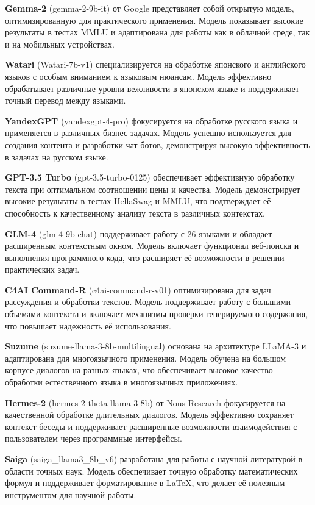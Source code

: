 \textbf{Gemma-2} (gemma-2-9b-it) от Google представляет собой открытую модель, оптимизированную для практического применения. Модель показывает высокие результаты в тестах MMLU и адаптирована для работы как в облачной среде, так и на мобильных устройствах. \cite{gemma}

\textbf{Watari} (Watari-7b-v1) специализируется на обработке японского и английского языков с особым вниманием к языковым нюансам. Модель эффективно обрабатывает различные уровни вежливости в японском языке и поддерживает точный перевод между языками. \cite{watari}

\textbf{YandexGPT} (yandexgpt-4-pro) фокусируется на обработке русского языка и применяется в различных бизнес-задачах. Модель успешно используется для создания контента и разработки чат-ботов, демонстрируя высокую эффективность в задачах на русском языке. \cite{yandexgpt}

\textbf{GPT-3.5 Turbo} (gpt-3.5-turbo-0125) обеспечивает эффективную обработку текста при оптимальном соотношении цены и качества. Модель демонстрирует высокие результаты в тестах HellaSwag и MMLU, что подтверждает её способность к качественному анализу текста в различных контекстах. \cite{gpt35}

\textbf{GLM-4} (glm-4-9b-chat) поддерживает работу с 26 языками и обладает расширенным контекстным окном. Модель включает функционал веб-поиска и выполнения программного кода, что расширяет её возможности в решении практических задач. \cite{chatglm}

\textbf{C4AI Command-R} (c4ai-command-r-v01) оптимизирована для задач рассуждения и обработки текстов. Модель поддерживает работу с большими объемами контекста и включает механизмы проверки генерируемого содержания, что повышает надежность её использования. \cite{c4ai}

\textbf{Suzume} (suzume-llama-3-8b-multilingual) основана на архитектуре LLaMA-3 и адаптирована для многоязычного применения. Модель обучена на большом корпусе диалогов на разных языках, что обеспечивает высокое качество обработки естественного языка в многоязычных приложениях. \cite{suzume}

\textbf{Hermes-2} (hermes-2-theta-llama-3-8b) от Nous Research фокусируется на качественной обработке длительных диалогов. Модель эффективно сохраняет контекст беседы и поддерживает расширенные возможности взаимодействия с пользователем через программные интерфейсы. \cite{hermes}

\textbf{Saiga} (saiga\_llama3\_8b\_v6) разработана для работы с научной литературой в области точных наук. Модель обеспечивает точную обработку математических формул и поддерживает форматирование в LaTeX, что делает её полезным инструментом для научной работы. \cite{saiga}


